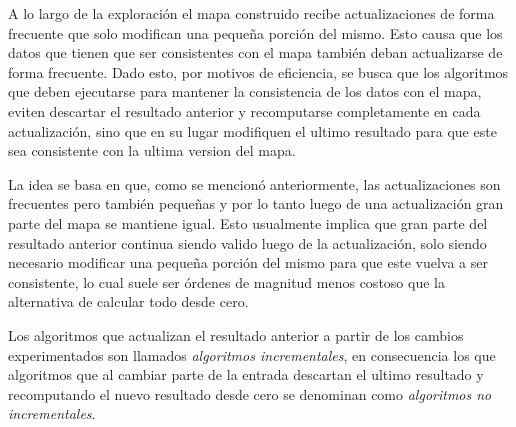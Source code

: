 

A lo largo de la exploración el mapa construido recibe actualizaciones de forma frecuente que solo modifican una pequeña porción del mismo. Esto causa que los datos que tienen que ser consistentes con el mapa también deban actualizarse de forma frecuente. Dado esto, por motivos de eficiencia, se busca que los algoritmos que deben ejecutarse para mantener la consistencia de los datos con el mapa, eviten descartar el resultado anterior y recomputarse completamente en cada actualización, sino que en su lugar modifiquen el ultimo resultado para que este sea consistente con la ultima version del mapa. 

La idea se basa en que, como se mencionó anteriormente, las actualizaciones son frecuentes pero también pequeñas y por lo tanto luego de una actualización gran parte del mapa se mantiene igual. Esto usualmente implica que gran parte del resultado anterior continua siendo valido luego de la actualización, solo siendo necesario modificar una pequeña porción del mismo para que este vuelva a ser consistente, lo cual suele ser órdenes de magnitud menos costoso que la alternativa de calcular todo desde cero. 

Los algoritmos que actualizan el resultado anterior a partir de los cambios experimentados son llamados \emph{algoritmos incrementales}, en consecuencia los que algoritmos que al cambiar parte de la entrada descartan el ultimo resultado y recomputando el nuevo resultado desde cero se denominan como \emph{algoritmos no incrementales}.

